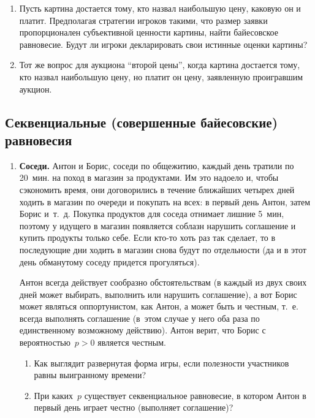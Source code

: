 \documentclass[a4paper,12pt]{article}
\begin{document}
\begin{enumerate}
\begin{enumerate}

\item Пусть картина достается тому, кто назвал наибольшую
цену, каковую он и платит. Предполагая стратегии игроков
такими, что размер заявки пропорционален субъективной
ценности картины, найти байесовское равновесие. Будут ли
игроки декларировать свои истинные оценки картины?

\item Тот же вопрос для аукциона ``второй цены'', когда
картина достается тому, кто назвал наибольшую цену, но
платит он цену, заявленную проигравшим аукцион.

\end{enumerate}

\end{enumerate}

\subsection{Секвенциальные (совершенные байесовские) рав\-но\-весия}

\begin{enumerate}


\item{\bf Соседи.} Антон и Борис, соседи по общежитию,
каждый день тратили по 20~мин. на поход в магазин за
продуктами. Им это надоело и, чтобы сэкономить время, они
договорились в течение ближайших четырех дней ходить в
магазин по очереди и покупать на всех: в первый день Антон,
затем Борис и~т.~д. Покупка продуктов для соседа отнимает
лишние 5~мин, поэтому у идущего в магазин появляется
соблазн нарушить соглашение и купить продукты только себе.
Если кто-то хоть раз так сделает, то в последующие дни
ходить в магазин снова будут по отдельности (да и в этот
день обманутому соседу придется прогуляться).

Антон всегда действует сообразно обстоятельствам (в каждый
из двух своих дней может выбирать, выполнить или нарушить
соглашение), а вот Борис может являться оппортунистом, как
Антон, а может быть и честным, т.~е. всегда выполнять
соглашение (в~этом случае у него оба раза по единственному
возможному действию). Антон верит, что Борис с
вероятностью~$p>0$ является честным.

\begin{enumerate}
  \item Как выглядит развернутая форма игры, если полезности
  участников равны выигранному времени?
  \item При каких~$p$ существует секвенциальное  равновесие,
  в котором Антон в первый день играет честно (выполняет
  соглашение)?
\end{enumerate}

\end{enumerate}
\end{document}
